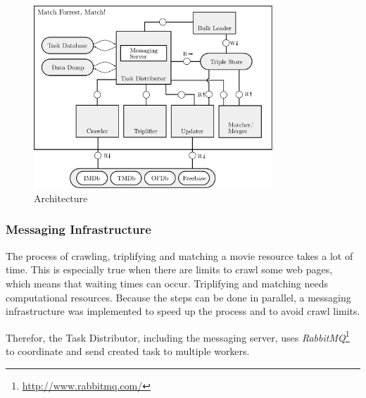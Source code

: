 \begin{figure}[ht]
  \begin{center}
  \includegraphics[width=0.8\textwidth]{images/architecture.pdf}
  \end{center}
  \caption{Architecture}
  \label{fig_architecture}
\end{figure}

\subsubsection{Messaging Infrastructure}
\label{subsubsec_messaging_infrastructure}


The process of crawling, triplifying and matching a movie resource takes a lot of time.
This is especially true when there are limits to crawl some web pages, which means that waiting times can occur.
Triplifying and matching needs computational resources.
Because the steps can be done in parallel, a messaging infrastructure was implemented to speed up the process and to avoid crawl limits.

Therefor, the Task Distributor, including the messaging server, uses \emph{RabbitMQ}\footnote{\url{http://www.rabbitmq.com/}} to coordinate and send created task to multiple workers.

